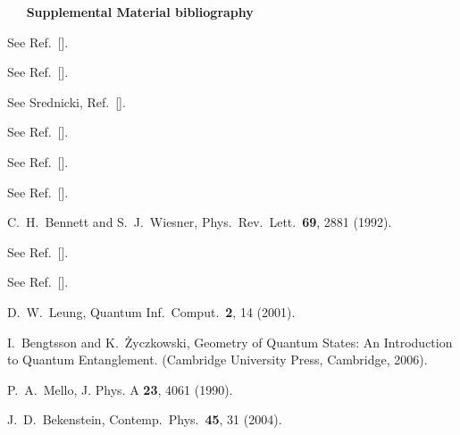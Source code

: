 \documentclass[twocolumn,aps,showpacs,prl]{revtex4}
\begin{document}
\begin{thebibliography}{16}
\vskip 0.2in
$~~~~~~~${\bf Supplemental Material bibliography}
\vskip 0.1in

See Ref.\ [].

See Ref.\ [].

See Srednicki, Ref.\ [].

See Ref.\ [].

See Ref.\ [].

See Ref.\ [].

C.\ H.\ Bennett and S.\ J.\ Wiesner,
Phys.\ Rev.\ Lett.\ {\bf 69}, 2881 (1992).

See Ref.\ [].

See Ref.\ [].

D.\ W.\ Leung,
Quantum Inf.\ Comput.\ {\bf 2}, 14 (2001).

I.\ Bengtsson and K.\ \.{Z}yczkowski,
Geometry of Quantum States: An Introduction to Quantum Entanglement.
(Cambridge University Press, Cambridge, 2006).

 P.\ A.\ Mello,
J. Phys. A {\bf 23}, 4061 (1990).

 J.\ D.\ Bekenstein,
Contemp.\ Phys.\ {\bf 45}, 31 (2004).

\end{thebibliography}
\end{document}

